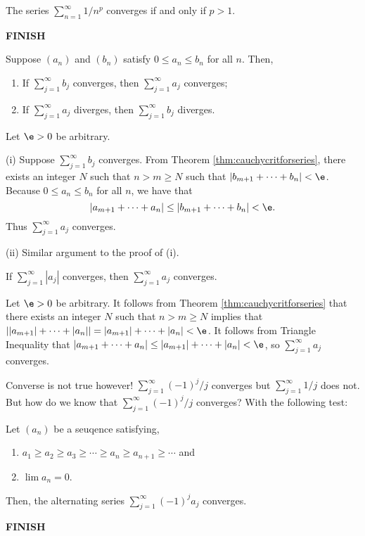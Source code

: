 \documentclass[class=article, crop=false]{standalone}
\begin{document}
\begin{thm}
    The series $\sum_{n=1}^{\infty} 1/n^p$ converges if and only if $p > 1$.
\end{thm}
\begin{pf}
    \textbf{FINISH}
\end{pf}

\begin{thm}
    Suppose $(a_n)$ and $(b_n)$ satisfy $0 \leq a_n \leq b_n$ for all $n$. Then,
        \begin{enumerate}[\normalfont(i)]
            \item If $\sum_{j=1}^{\infty} b_j$ converges, then $\sum_{j=1}^{\infty} a_j$ converges;
            \item If $\sum_{j=1}^{\infty} a_j$ diverges, then $\sum_{j=1}^{\infty} b_j$ diverges.
        \end{enumerate}
\end{thm}
\begin{pf}
    Let $\e > 0$ be arbitrary.

    (i) Suppose $\sum_{j=1}^{\infty} b_j$ converges. From Theorem \ref{thm:cauchycritforseries}, there exists an integer $N$ such that $n > m \geq N$ such that $|b_{m+1}+\cdots+b_n| < \e$. Because $0 \leq a_n \leq b_n$ for all $n$, we have that
        \[
            |a_{m+1}+\cdots + a_n| \leq |b_{m+1}+\cdots+b_n| < \e.
        \]
    Thus $\sum_{j=1}^{\infty} a_j$ converges.

    (ii) Similar argument to the proof of (i).
\end{pf}

\begin{thm}
    If $\sum_{j=1}^{\infty} |a_j|$ converges, then $\sum_{j=1}^{\infty} a_j$ converges.
\end{thm}
\begin{pf}
    Let $\e > 0$ be arbitrary. It follows from Theorem \ref{thm:cauchycritforseries} that there exists an integer $N$ such that $n > m \geq N$ implies that $||a_{m+1}|+\cdots+|a_n|| = |a_{m+1}| + \cdots + |a_n|<\e$. It follows from Triangle Inequality that
    $|a_{m+1} + \cdots + a_n | \leq |a_{m+1}| + \cdots + |a_n|<\e$, so $\sum_{j=1}^{\infty} a_j$ converges.
\end{pf}

Converse is not true however! $\sum_{j=1}^{\infty} (-1)^j/j$ converges but $\sum_{j=1}^{\infty} 1/j$ does not. But how do we know that $\sum_{j=1}^{\infty} (-1)^j/j$ converges? With the following test:

\begin{thm}
    Let $(a_n)$ be a seuqence satisfying,
        \begin{enumerate}[\normalfont(i)]
            \item $a_1 \geq a_2 \geq a_3 \geq \cdots \geq a_n \geq a_{n+1} \geq \cdots$ and
            \item $\lim a_n = 0$.
        \end{enumerate}
    Then, the alternating series $\sum_{j=1}^{\infty} (-1)^ja_j$ converges.
\end{thm}
\begin{pf}
    \textbf{ FINISH}
\end{pf}
\end{document}
